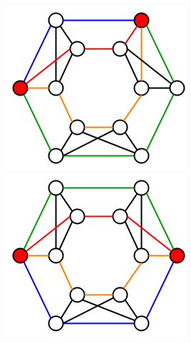 \documentclass[russian]{article}
\begin{document}
\begin{figure}[H]
\begin{minipage}[t]{0.5\columnwidth}%
\begin{center}
\includegraphics[scale=0.45]{6_7b_2.png}
\par\end{center}%
\end{minipage}\hfill{}%
\begin{minipage}[t]{0.5\columnwidth}%
\begin{center}
\includegraphics[scale=0.45]{6_7b_3.png}
\par\end{center}%
\end{minipage}\linebreak{}



\end{figure}
\end{document}

